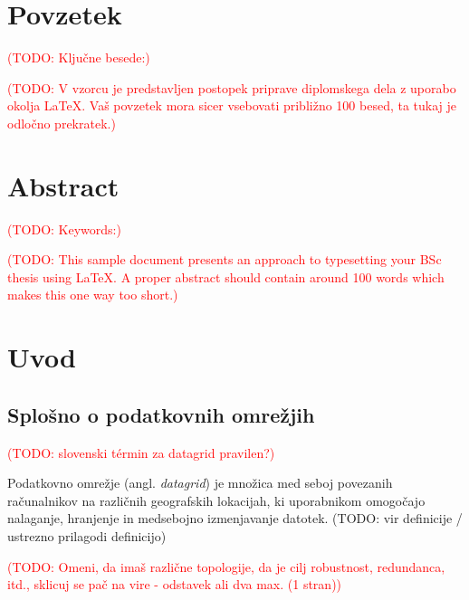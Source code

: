 \documentclass[a4paper, 12pt]{book}
\newcommand{\TODO}[1]{\textcolor{red}{(TODO: #1)}}
\newcommand{\clearemptydoublepage}{
	\newpage{\pagestyle{empty}\cleardoublepage}}
\begin{document}
\clearemptydoublepage


\chapter*{Povzetek}

\TODO{Ključne besede:}%

\TODO{V vzorcu je predstavljen postopek priprave diplomskega dela z uporabo
okolja \LaTeX. Vaš povzetek mora sicer vsebovati približno 100 besed, ta
tukaj je odločno prekratek.}

\clearemptydoublepage


\chapter*{Abstract}

\TODO{Keywords:}

\TODO{This sample document presents an approach to typesetting your BSc
thesis using \LaTeX. A proper abstract should contain around 100 words which
makes this one way too short.}


\clearemptydoublepage


\mainmatter
\setcounter{page}{1}
\pagestyle{fancy}

\chapter{Uvod}

\section{Splošno o podatkovnih omrežjih}

\TODO{slovenski términ za datagrid pravilen?}

Podatkovno omrežje (angl. \textit{datagrid}) je množica med seboj
povezanih računalnikov na različnih geografskih lokacijah, ki uporabnikom
omogočajo nalaganje, hranjenje in medsebojno izmenjavanje datotek.
(TODO: vir definicije / ustrezno prilagodi definicijo)

\TODO{Omeni, da imaš različne topologije, da je cilj robustnost, redundanca,
itd., sklicuj se pač na vire - odstavek ali dva max. (1 stran)}
\end{document}
